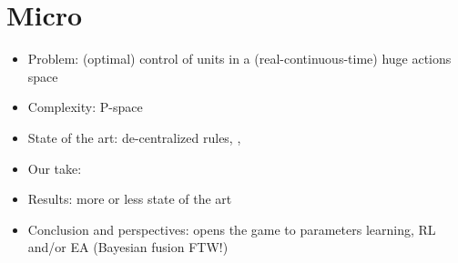 \chapter{Micro}
\begin{itemize}
\item Problem: (optimal) control of units in a (real-continuous-time) huge actions space
\item Complexity: P-space
\item State of the art: de-centralized rules, \citep{Marthi05concurrenthierarchical}, \citep{WeberCIG10}
\item Our take: \citep{SYNNAEVE:Micro}
\item Results: more or less state of the art
\item Conclusion and perspectives: opens the game to parameters learning, RL and/or EA (Bayesian fusion FTW!)
\end{itemize}


